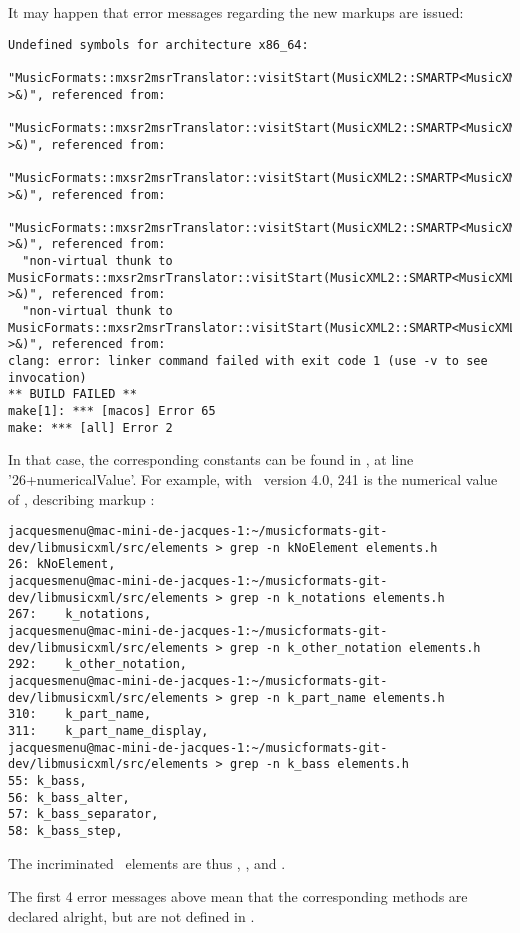 It may happen that error messages regarding the new markups are issued:
\begin{lstlisting}[language=TerminalSmall]
Undefined symbols for architecture x86_64:
  "MusicFormats::mxsr2msrTranslator::visitStart(MusicXML2::SMARTP<MusicXML2::musicxml<241> >&)", referenced from:
  "MusicFormats::mxsr2msrTranslator::visitStart(MusicXML2::SMARTP<MusicXML2::musicxml<266> >&)", referenced from:
  "MusicFormats::mxsr2msrTranslator::visitStart(MusicXML2::SMARTP<MusicXML2::musicxml<284> >&)", referenced from:
  "MusicFormats::mxsr2msrTranslator::visitStart(MusicXML2::SMARTP<MusicXML2::musicxml<29> >&)", referenced from:
  "non-virtual thunk to MusicFormats::mxsr2msrTranslator::visitStart(MusicXML2::SMARTP<MusicXML2::musicxml<284> >&)", referenced from:
  "non-virtual thunk to MusicFormats::mxsr2msrTranslator::visitStart(MusicXML2::SMARTP<MusicXML2::musicxml<29> >&)", referenced from:
clang: error: linker command failed with exit code 1 (use -v to see invocation)
** BUILD FAILED **
make[1]: *** [macos] Error 65
make: *** [all] Error 2
\end{lstlisting}

In that case, the corresponding constants can be found in , at line '26+numericalValue'. For example, with  \mxml\ version 4.0, 241 is the numerical value of , describing markup :
\begin{lstlisting}[language=TerminalSmall]
jacquesmenu@mac-mini-de-jacques-1:~/musicformats-git-dev/libmusicxml/src/elements > grep -n kNoElement elements.h
26:	kNoElement,
jacquesmenu@mac-mini-de-jacques-1:~/musicformats-git-dev/libmusicxml/src/elements > grep -n k_notations elements.h
267:	k_notations,
jacquesmenu@mac-mini-de-jacques-1:~/musicformats-git-dev/libmusicxml/src/elements > grep -n k_other_notation elements.h
292:	k_other_notation,
jacquesmenu@mac-mini-de-jacques-1:~/musicformats-git-dev/libmusicxml/src/elements > grep -n k_part_name elements.h
310:	k_part_name,
311:	k_part_name_display,
jacquesmenu@mac-mini-de-jacques-1:~/musicformats-git-dev/libmusicxml/src/elements > grep -n k_bass elements.h
55:	k_bass,
56:	k_bass_alter,
57:	k_bass_separator,
58:	k_bass_step,
\end{lstlisting}

The incriminated \mxsrRepr\ elements are thus , ,  and .

The first 4 error messages above mean that the corresponding  methods  are declared alright, but are not defined in .

